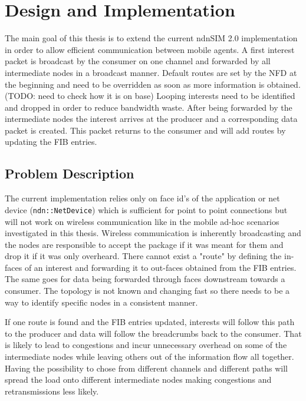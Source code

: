 \chapter{Design and Implementation}

The main goal of this thesis is to extend the current ndnSIM 2.0 implementation in order to allow efficient communication between mobile agents. A first interest packet is broadcast by the consumer on one channel and forwarded by all intermediate nodes in a broadcast manner. Default routes are set by the NFD at the beginning and need to be overridden as soon as more information is obtained. (TODO: need to check how it is on base) Looping interests need to be identified and dropped in order to reduce bandwidth waste. After being forwarded by the intermediate nodes the interest arrives at the producer and a corresponding data packet is created. This packet returns to the consumer and will add routes by updating the FIB entries.

\section{Problem Description}

The current implementation relies only on face id's of the application or net device (\texttt{ndn::NetDevice}) which is sufficient for point to point connections but will not work on wireless communication like in the mobile ad-hoc scenarios investigated in this thesis. Wireless communication is inherently broadcasting and the nodes are responsible to accept the package if it was meant for them and drop it if it was only overheard. There cannot exist a "route" by defining the in-faces of an interest and forwarding it to out-faces obtained from the FIB entries. The same goes for data being forwarded through faces downstream towards a consumer. The topology is not known and changing fast so there needs to be a way to identify specific nodes in a consistent manner.

If one route is found and the FIB entries updated, interests will follow this path to the producer and data will follow the breadcrumbs back to the consumer. That is likely to lead to congestions and incur unnecessary overhead on some of the intermediate nodes while leaving others out of the information flow all together. Having the possibility to chose from different channels and different paths will spread the load onto different intermediate nodes making congestions and retransmissions less likely.



